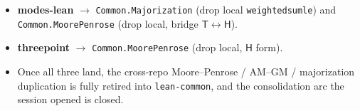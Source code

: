 \documentclass[11pt]{article}
\renewcommand{\_}{\textunderscore\allowbreak}
\begin{document}
\sloppy
\begin{itemize}[leftmargin=1.4em]
  \item \textbf{modes-lean} \(\to\) \texttt{Common.Majorization} (drop local
    \texttt{weighted\_sum\_le}) and \texttt{Common.MoorePenrose} (drop local,
    bridge \(\mathsf{T}\leftrightarrow\mathsf{H}\)).
  \item \textbf{threepoint} \(\to\) \texttt{Common.MoorePenrose} (drop local,
    \(\mathsf{H}\) form).
  \item Once all three land, the cross-repo Moore--Penrose / AM--GM /
    majorization duplication is fully retired into \texttt{lean-common}, and the
    consolidation arc the session opened is closed.
\end{itemize}
\end{document}
